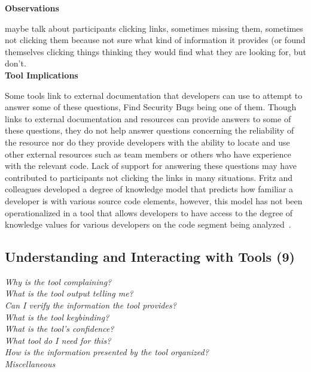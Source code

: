 \documentclass[conference]{IEEEtran}
\begin{document}
\noindent\textbf{Observations}

maybe talk about participants clicking links, sometimes missing them, sometimes not clicking them because not sure what kind of information it provides (or found themselves clicking things thinking they would find what they are looking for, but don't.
\\

\noindent\textbf{Tool Implications}

Some tools link to external documentation that developers can use to attempt to answer some of these questions, Find Security Bugs being one of them. 
Though links to external documentation and resources can provide answers to some of these questions, they do not help answer questions concerning the reliability of the resource nor do they provide developers with the ability to locate and use other external resources such as team members or others who have experience with the relevant code.
Lack of support for answering these questions may have contributed to participants not clicking the links in many situations.  
Fritz and colleagues developed a degree of knowledge model that predicts how familiar a developer is with various source code elements, however, this model has not been operationalized in a tool that allows developers to have access to the degree of knowledge values for various developers on the code segment being analyzed~\cite{fritz2010degree}.




\noindent\subsection{\textbf{Understanding and Interacting with Tools (9)}}\label{uit}

\noindent\emph{Why is the tool complaining?} \\
\emph{What is the tool output telling me?} \\
\emph{Can I verify the information the tool provides?} \\
\emph{What is the tool keybinding?} \\
\emph{What is the tool's confidence?} \\
\emph{What tool do I need for this?} \\
\emph{How is the information presented by the tool organized?} \\
\emph{Miscellaneous} \\
\end{document}
